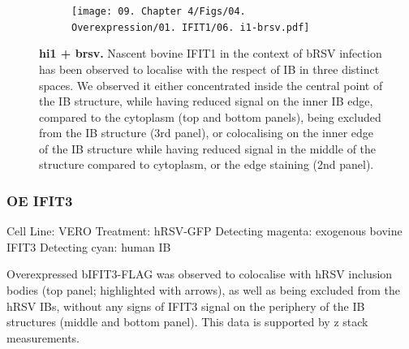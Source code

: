 \begin{figure}
\begin{subfigure}{0.5\textwidth}
    \end{subfigure}
    \begin{subfigure}{1\textwidth}
        \centering
        \caption{}
        \texttt{[image: 09. Chapter 4/Figs/04. Overexpression/01. IFIT1/06. i1-brsv.pdf]}
    \end{subfigure}
    \caption[hi1 + brsv]{\textbf{hi1 + brsv.} Nascent bovine IFIT1 in the context of bRSV infection has been observed to localise with the respect of IB in three distinct spaces. We observed it either concentrated inside the central point of the IB structure, while having reduced signal on the inner IB edge, compared to the cytoplasm (top and bottom panels), being excluded from the IB structure (3rd panel), or colocalising on the inner edge of the IB structure while having reduced signal in the middle of the structure compared to cytoplasm, or the edge staining (2nd panel).}
    \label{fig:hi1 + brsv}
\end{figure}

\subsubsection{OE IFIT3}
Cell Line: VERO \newline
Treatment: hRSV-GFP \newline
Detecting magenta: exogenous bovine IFIT3 \newline
Detecting cyan: human IB \newline

Overexpressed bIFIT3-FLAG was observed to colocalise with hRSV inclusion bodies (top panel; highlighted with arrows), as well as being excluded from the hRSV IBs, without any signs of IFIT3 signal on the periphery of the IB structures (middle and bottom panel). This data is supported by z stack measurements.

